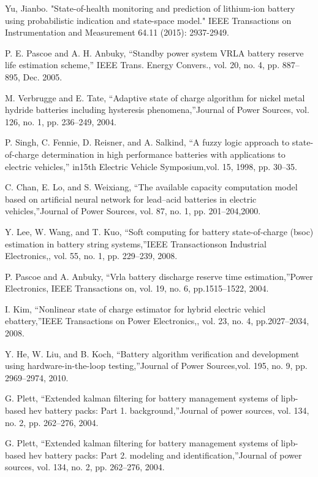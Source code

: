 Yu, Jianbo. "State-of-health monitoring and prediction of lithium-ion battery using probabilistic indication and state-space model." IEEE Transactions on Instrumentation and Measurement 64.11 (2015): 2937-2949.

P. E. Pascoe and A. H. Anbuky, “Standby power system VRLA battery
reserve life estimation scheme,” IEEE Trans. Energy Convers., vol. 20,
no. 4, pp. 887–895, Dec. 2005.

M.  Verbrugge  and  E.  Tate,  “Adaptive  state  of  charge  algorithm  for nickel metal hydride batteries including hysteresis phenomena,”Journal of Power Sources, vol. 126, no. 1, pp. 236–249, 2004.

 P. Singh, C. Fennie, D. Reisner, and A. Salkind, “A fuzzy logic approach to  state-of-charge  determination  in  high  performance  batteries  with applications  to  electric  vehicles,”  in15th  Electric  Vehicle  Symposium,vol. 15, 1998, pp. 30–35.

  C. Chan, E. Lo, and S. Weixiang, “The available capacity computation model  based  on  artificial  neural  network  for  lead–acid  batteries  in electric vehicles,”Journal of Power Sources, vol. 87, no. 1, pp. 201–204,2000.

 Y.  Lee,  W.  Wang,  and  T.  Kuo,  “Soft  computing  for  battery  state-of-charge (bsoc) estimation in battery string systems,”IEEE Transactionson Industrial Electronics,, vol. 55, no. 1, pp. 229–239, 2008.

 P.  Pascoe  and  A.  Anbuky,  “Vrla  battery  discharge  reserve  time  estimation,”Power  Electronics,  IEEE  Transactions  on,  vol.  19,  no.  6,  pp.1515–1522, 2004.

 I. Kim, “Nonlinear state of charge estimator for hybrid electric vehicl ebattery,”IEEE  Transactions  on  Power  Electronics,,  vol.  23,  no.  4,  pp.2027–2034, 2008.

 Y. He, W. Liu, and B. Koch, “Battery algorithm verification and development using hardware-in-the-loop testing,”Journal of Power Sources,vol. 195, no. 9, pp. 2969–2974, 2010.

 G.  Plett,  “Extended  kalman  filtering  for  battery  management  systems of lipb-based hev battery packs: Part 1. background,”Journal of power sources, vol. 134, no. 2, pp. 262–276, 2004.

G. Plett, “Extended  kalman  filtering  for  battery  management  systems  of lipb-based  hev  battery  packs:  Part  2.  modeling  and  identification,”Journal of power sources, vol. 134, no. 2, pp. 262–276, 2004. 

